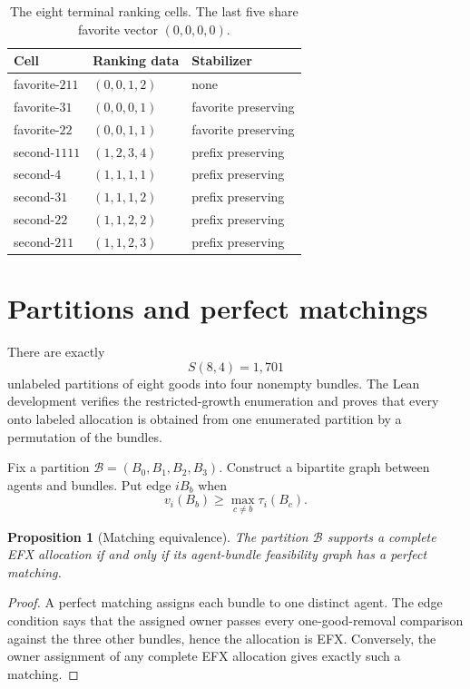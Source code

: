 \documentclass[11pt]{article}
\newtheorem{proposition}[theorem]{Proposition}
\theoremstyle{definition}
\newcommand{\B}{\mathcal{B}}
\begin{document}
\begin{table}[ht]
\centering
\small
\begin{tabular}{@{}lll@{}}
\toprule
Cell & Ranking data & Stabilizer\\
\midrule
favorite-$211$ & $(0,0,1,2)$ & none\\
favorite-$31$ & $(0,0,0,1)$ & favorite preserving\\
favorite-$22$ & $(0,0,1,1)$ & favorite preserving\\
second-$1111$ & $(1,2,3,4)$ & prefix preserving\\
second-$4$ & $(1,1,1,1)$ & prefix preserving\\
second-$31$ & $(1,1,1,2)$ & prefix preserving\\
second-$22$ & $(1,1,2,2)$ & prefix preserving\\
second-$211$ & $(1,1,2,3)$ & prefix preserving\\
\bottomrule
\end{tabular}
\caption{The eight terminal ranking cells. The last five share favorite
vector $(0,0,0,0)$.}
\label{tab:cells}
\end{table}

\section{Partitions and perfect matchings}\label{sec:matching}

There are exactly
\[
  S(8,4)=1,701
\]
unlabeled partitions of eight goods into four nonempty bundles. The Lean
development verifies the restricted-growth enumeration and proves that every
onto labeled allocation is obtained from one enumerated partition by a
permutation of the bundles.

Fix a partition $\B=(B_0,B_1,B_2,B_3)$. Construct a bipartite graph between
agents and bundles. Put edge $iB_b$ when
\[
  v_i(B_b)\ge\max_{c\ne b}\tau_i(B_c).
\]

\begin{proposition}[Matching equivalence]\label{prop:matching}
The partition $\B$ supports a complete EFX allocation if and only if its
agent-bundle feasibility graph has a perfect matching.
\end{proposition}

\begin{proof}
A perfect matching assigns each bundle to one distinct agent. The edge
condition says that the assigned owner passes every one-good-removal
comparison against the three other bundles, hence the allocation is EFX.
Conversely, the owner assignment of any complete EFX allocation gives
exactly such a matching.
\end{proof}
\end{document}
